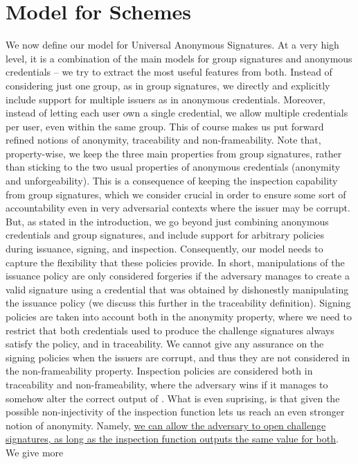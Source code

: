 \section{Model for \UAS Schemes}
\label{sec:model-uas}

We now define our model for Universal Anonymous Signatures. At a very high
level, it is a combination of the main models for group signatures and
anonymous credentials -- we try to extract the most useful features from both.
Instead of considering just one group, as in group signatures, we directly and
explicitly include support for multiple issuers as in anonymous credentials.
Moreover, instead of letting each user own a single credential, we allow
multiple credentials per user, even within the same group. This of course
makes us put forward refined notions of anonymity, traceability and
non-frameability. Note that, property-wise, we keep the three main properties
from group signatures, rather than sticking to the two usual properties of
anonymous credentials (anonymity and unforgeability). This is a consequence
of keeping the inspection capability from group signatures, which we consider
crucial in order to ensure some sort of accountability even in very adversarial
contexts where the issuer may be corrupt.
%
But, as stated in the introduction, we go beyond just combining anonymous
credentials and group signatures, and include support for arbitrary policies
during issuance, signing, and inspection. Consequently, our model needs to
capture the flexibility that these policies provide. In short, manipulations of
the issuance policy are only considered forgeries if the adversary manages to
create a valid signature using a credential that was obtained by dishonestly
manipulating the issuance policy (we discuss this further in the traceability
definition). Signing policies are taken into account both in the anonymity
property, where we need to restrict that both credentials used to produce the
challenge signatures always satisfy the policy, and in traceability.
We cannot give any assurance on the signing policies when the issuers are
corrupt, and thus they are not considered in the non-frameability property.
Inspection policies are considered both in traceability and non-frameability,
where the adversary wins if it manages to somehow alter the correct output of
\Inspect. What is even suprising, is that given the possible non-injectivity of
the inspection function lets us reach an even stronger notion of anonymity.
Namely, \uline{we can allow the adversary to open challenge signatures, as
  long as the inspection function outputs the same value for both}. We give more
